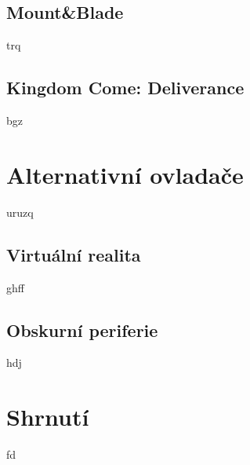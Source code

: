 \subsection{Mount\&Blade}
trq

\subsection{Kingdom Come: Deliverance}
bgz


\section{Alternativní ovladače}
uruzq

\subsection{Virtuální realita}
ghff

\subsection{Obskurní periferie}
hdj


\section{Shrnutí}
fd
